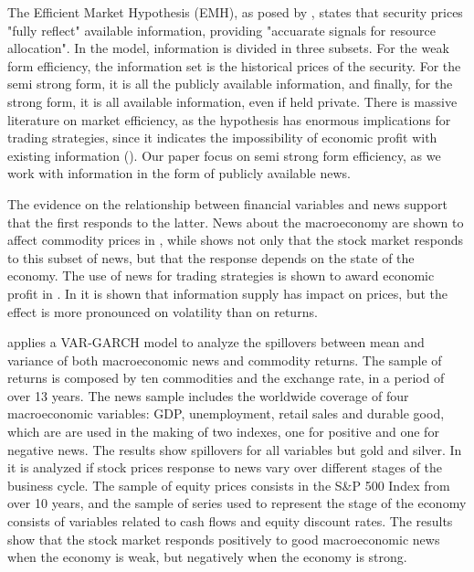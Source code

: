 \documentclass[cic,tc, english]{iiufrgs}
\begin{document}
    The Efficient Market Hypothesis (EMH), as posed by \citet{fama1970}, states that security prices "fully reflect" available information, providing "accuarate signals for resource allocation". In the model, information is divided in three subsets. For the weak form efficiency, the information set is the historical prices of the security. For the semi strong form, it is all the publicly available information, and finally, for the strong form, it is all available information, even if held private. There is massive literature on market efficiency, as the hypothesis has enormous implications for trading strategies, since it indicates the impossibility of economic profit with existing information (\citet{kamal2014}). Our paper focus on semi strong form efficiency, as we work with information in the form of publicly available news.

    The evidence on the relationship between financial variables and news support that the first responds to the latter. News about the macroeconomy are shown to affect commodity prices in \citet{caporaleetal2015}, while \citet{macqueenroley1993} shows not only that the stock market responds to this subset of news, but that the response depends on the state of the economy. The use of news for trading strategies is shown to award economic profit in \citet{larsenthorsrud2017}. In \citet{moussaetal2017} it is shown that information supply has impact on prices, but the effect is more pronounced on volatility than on returns.

    \citet{caporaleetal2015} applies a VAR-GARCH model to analyze the spillovers between mean and variance of both macroeconomic news and commodity returns. The sample of returns is composed by ten commodities and the exchange rate, in a period of over 13 years. The news sample includes the worldwide coverage of four macroeconomic variables: GDP, unemployment, retail sales and durable good, which are are used in the making of two indexes, one for positive and one for negative news. The results show spillovers for all variables but gold and silver.
    In \citet{macqueenroley1993} it is analyzed if stock prices response to news vary over different stages of the business cycle. The sample of equity prices consists in the S\&P 500 Index from over 10 years, and the sample of series used to represent the stage of the economy consists of variables related to cash flows and equity discount rates. The results show that the stock market responds positively to good macroeconomic news when the economy is weak, but negatively when the economy is strong.
\end{document}
